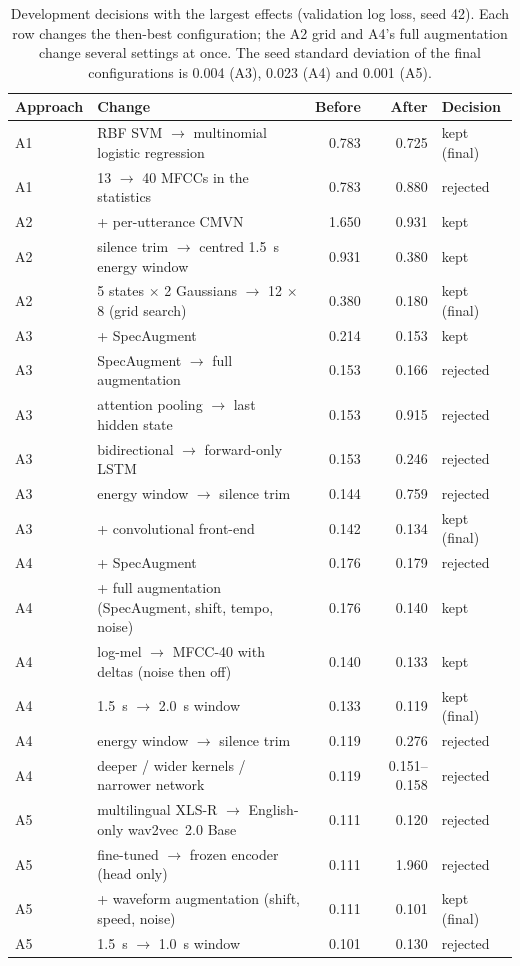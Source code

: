 \begin{table}[t]
  \centering
  \caption{Development decisions with the largest effects (validation log loss, seed 42). Each row changes the
  then-best configuration; the A2 grid and A4's full augmentation change several settings at once. The seed standard
  deviation of the final configurations is 0.004 (A3), 0.023 (A4) and 0.001 (A5).}
  \label{tab:ablations}
  \small
  \begin{tabular}{@{}llrrl@{}}
    \toprule
    Approach & Change & Before & After & Decision \\
    \midrule
    A1 & RBF SVM $\to$ multinomial logistic regression & 0.783 & 0.725 & kept (final) \\
    A1 & 13 $\to$ 40 MFCCs in the statistics & 0.783 & 0.880 & rejected \\
    A2 & + per-utterance CMVN & 1.650 & 0.931 & kept \\
    A2 & silence trim $\to$ centred 1.5~s energy window & 0.931 & 0.380 & kept \\
    A2 & 5 states $\times$ 2 Gaussians $\to$ 12 $\times$ 8 (grid search) & 0.380 & 0.180 & kept (final) \\
    A3 & + SpecAugment & 0.214 & 0.153 & kept \\
    A3 & SpecAugment $\to$ full augmentation & 0.153 & 0.166 & rejected \\
    A3 & attention pooling $\to$ last hidden state & 0.153 & 0.915 & rejected \\
    A3 & bidirectional $\to$ forward-only LSTM & 0.153 & 0.246 & rejected \\
    A3 & energy window $\to$ silence trim & 0.144 & 0.759 & rejected \\
    A3 & + convolutional front-end & 0.142 & 0.134 & kept (final) \\
    A4 & + SpecAugment & 0.176 & 0.179 & rejected \\
    A4 & + full augmentation (SpecAugment, shift, tempo, noise) & 0.176 & 0.140 & kept \\
    A4 & log-mel $\to$ MFCC-40 with deltas (noise then off) & 0.140 & 0.133 & kept \\
    A4 & 1.5~s $\to$ 2.0~s window & 0.133 & 0.119 & kept (final) \\
    A4 & energy window $\to$ silence trim & 0.119 & 0.276 & rejected \\
    A4 & deeper / wider kernels / narrower network & 0.119 & 0.151--0.158 & rejected \\
    A5 & multilingual XLS-R $\to$ English-only wav2vec~2.0 Base & 0.111 & 0.120 & rejected \\
    A5 & fine-tuned $\to$ frozen encoder (head only) & 0.111 & 1.960 & rejected \\
    A5 & + waveform augmentation (shift, speed, noise) & 0.111 & 0.101 & kept (final) \\
    A5 & 1.5~s $\to$ 1.0~s window & 0.101 & 0.130 & rejected \\
    \bottomrule
  \end{tabular}
\end{table}

